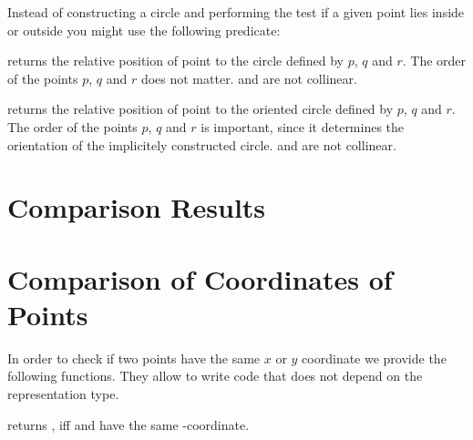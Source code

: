 Instead of constructing a circle and performing the test if a 
given point lies inside or outside you might use the following
predicate:

         {returns the relative position of point 
          to the circle defined by $p$, $q$ and $r$. The order
          of the points $p$, $q$ and $r$ does not matter.
          \precond {} and  are not collinear.}
 
         {returns the relative position of point 
          to the oriented circle defined by $p$, $q$ and $r$.
	  The order of the points $p$, $q$ and $r$ is important,
	  since it determines the orientation of the implicitely
          constructed circle.
          \precond {} and  are not collinear.}


\section{Comparison Results}



\section{Comparison of Coordinates of Points}

In order to check if two points have the same $x$ or $y$ coordinate
we provide the following functions. They allow to write code that
does not depend on the representation type.


         {returns , iff  and 
	  have the same -coordinate.}

